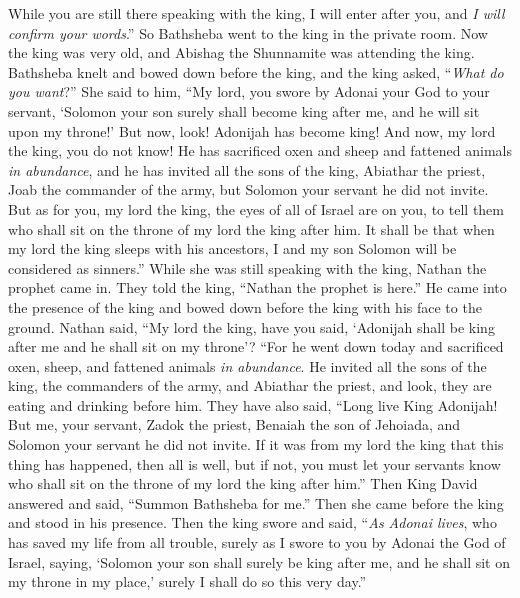 \begin{biblechapter}
\verse While you are still there speaking with the king, I will enter after you, and \textit{I will confirm your words}.”
\verse So Bathsheba went to the king in the private room. Now the king was very old, and Abishag the Shunnamite was attending the king.
\verse Bathsheba knelt and bowed down before the king, and the king asked, “\textit{What do you want}?”
\verse She said to him, “My lord, you swore by Adonai your God to your servant, ‘Solomon your son surely shall become king after me, and he will sit upon my throne!’
\verse But now, look! Adonijah has become king! And now, my lord the king, you do not know!
\verse He has sacrificed oxen and sheep and fattened animals \textit{in abundance}, and he has invited all the sons of the king, Abiathar the priest, Joab the commander of the army, but Solomon your servant he did not invite.
\verse But as for you, my lord the king, the eyes of all of Israel are on you, to tell them who shall sit on the throne of my lord the king after him.
\verse It shall be that when my lord the king sleeps with his ancestors, I and my son Solomon will be considered as sinners.”
\verse While she was still speaking with the king, Nathan the prophet came in.
\verse They told the king, “Nathan the prophet is here.” He came into the presence of the king and bowed down before the king with his face to the ground.
\verse Nathan said, “My lord the king, have you said, ‘Adonijah shall be king after me and he shall sit on my throne’?
\verse “For he went down today and sacrificed oxen, sheep, and fattened animals \textit{in abundance}. He invited all the sons of the king, the commanders of the army, and Abiathar the priest, and look, they are eating and drinking before him. They have also said, “Long live King Adonijah!
\verse But me, your servant, Zadok the priest, Benaiah the son of Jehoiada, and Solomon your servant he did not invite.
\verse If it was from my lord the king that this thing has happened, then all is well, but if not, you must let your servants know who shall sit on the throne of my lord the king after him.”
\verse Then King David answered and said, “Summon Bathsheba for me.” Then she came before the king and stood in his presence.
\verse Then the king swore and said, “\textit{As Adonai lives}, who has saved my life from all trouble,
\verse surely as I swore to you by Adonai the God of Israel, saying, ‘Solomon your son shall surely be king after me, and he shall sit on my throne in my place,’ surely I shall do so this very day.”

\end{biblechapter}
